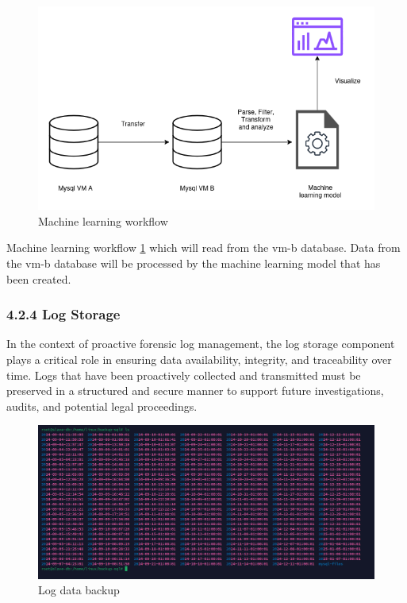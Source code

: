 \begin{figure}[H] 
	\centering
	\includegraphics[width=14cm]{figure/ml-workflow.png}
	\caption{Machine learning workflow}
	\label{fig:mlops}
\end{figure}

Machine learning workflow \ref{fig:mlops} which will read from the vm-b database. Data from the vm-b database will be processed by the machine learning model that has been created.

\subsubsection{4.2.4 Log Storage}
In the context of proactive forensic log management, the log storage component plays a critical role in ensuring data availability, integrity, and traceability over time. Logs that have been proactively collected and transmitted must be preserved in a structured and secure manner to support future investigations, audits, and potential legal proceedings.

\begin{figure}[H] 
	\centering
	\includegraphics[width=14cm]{figure/log-backup-sql.png}
	\caption{Log data backup}
	\label{fig:logs-backup-linux}
\end{figure}

